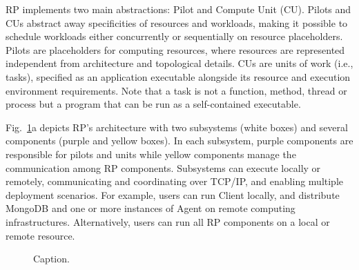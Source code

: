 \documentclass[preprint,12pt, a4paper]{elsarticle}
\begin{document}
RP implements two main abstractions: Pilot and Compute Unit (CU). Pilots and
CUs abstract away specificities of resources and workloads, making it
possible to schedule workloads either concurrently or sequentially on
resource placeholders. Pilots are placeholders for computing resources, where
resources are represented independent from architecture and topological
details. CUs are units of work (i.e., tasks), specified as an application
executable alongside its resource and execution environment requirements.
Note that a task is not a function, method, thread or process but a program
that can be run as a self-contained executable.

Fig.~\ref{fig:archs}a depicts RP's architecture with two subsystems (white
boxes) and several components (purple and yellow boxes). In each subsystem,
purple components are responsible for pilots and units while yellow
components manage the communication among RP components. Subsystems can
execute locally or remotely, communicating and coordinating over TCP/IP\@,
and enabling multiple deployment scenarios. For example, users can run Client
locally, and distribute MongoDB and one or more instances of Agent on remote
computing infrastructures. Alternatively, users can run all RP components on
a local or remote resource.

\begin{figure}
    \centering
    \qquad
    \caption{Caption. }\label{fig:archs}
\end{figure}
\end{document}
